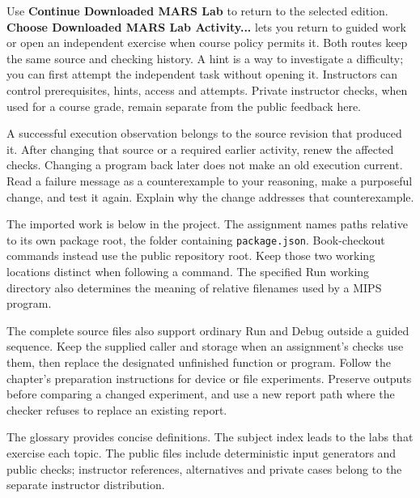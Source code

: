 Use \textbf{Continue Downloaded MARS Lab} to return to the selected edition.
\textbf{Choose Downloaded MARS Lab Activity...} lets you return to guided work or
open an independent exercise when course policy permits it. Both routes keep the
same source and checking history. A hint is a way to investigate a difficulty;
you can first attempt the independent task without opening it. Instructors can
control prerequisites, hints, access and attempts. Private instructor checks,
when used for a course grade, remain separate from the public feedback here.

A successful execution observation belongs to the source revision that produced
it. After changing that source or a required earlier activity, renew the affected
checks. Changing a program back later does not make an old execution current.
Read a failure message as a counterexample to your reasoning, make a purposeful
change, and test it again. Explain why the change addresses that counterexample.

\begin{samepage}
  The imported work is below
   in the project. The assignment
  names paths relative to its own package root, the folder containing
  \texttt{package.json}. Book-checkout commands instead use the public repository
  root. Keep those two working locations distinct when following a command. The
  specified Run working directory also determines the meaning of relative filenames
  used by a MIPS program.\par
\end{samepage}

The complete source files also support ordinary Run and Debug outside a guided
sequence. Keep the supplied caller and storage when an assignment's checks use
them, then replace the designated unfinished function or program. Follow the
chapter's preparation instructions for device or file experiments. Preserve
outputs before comparing a changed experiment, and use a new report path where
the checker refuses to replace an existing report.

The glossary provides concise definitions. The subject index leads to the labs
that exercise each topic. The public files include deterministic input generators
and public checks; instructor references, alternatives and private cases belong
to the separate instructor distribution.
